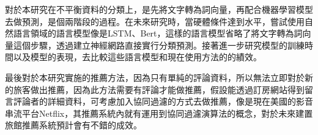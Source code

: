 \newpage
	
	對於本研究在不平衡資料的分類上，是先將文字轉為詞向量，再配合機器學習模型去做預測，是個兩階段的過程。在未來研究時，當硬體條件達到水平，嘗試使用自然語言領域的語言模型像是LSTM、Bert，這樣的語言模型省略了將文字轉為詞向量這個步驟，透過建立神經網路直接實行分類預測。接著進一步研究模型的訓練時間以及模型的表現，去比較這些語言模型和現在使用方法的的績效。
	
	最後對於本研究實施的推薦方法，因為只有單純的評論資料，所以無法立即對於新的旅客做出推薦，因為此方法需要有評論才能做推薦，假設能透過訂房網站得到留言評論者的詳細資料，可考慮加入協同過濾的方式去做推薦，像是現在美國的影音串流平台Netflix，其推薦系統內就有運用到協同過濾演算法的概念，對於未來建置旅館推薦系統預計會有不錯的成效。

%










